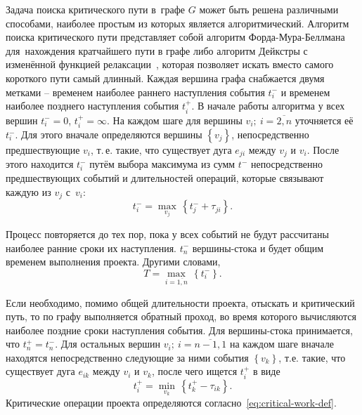 Задача поиска критического пути в~графе $G$ может быть решена различными способами, наиболее простым из которых является алгоритмический. Алгоритм поиска критического пути представляет собой алгоритм Форда-Мура-Беллмана для~нахождения кратчайшего пути в графе либо алгоритм Дейкстры с изменённой функцией релаксации~\cite{Kormen, Indians_CPM}, которая позволяет искать вместо самого короткого пути самый длинный. Каждая вершина графа снабжается двумя метками – временем наиболее раннего наступления события $t_{i}^{-}$ и временем наиболее позднего наступления события $t_{i}^{+}$. В начале работы алгоритма у всех вершин $t_{i}^{-}=0$, $t_{i}^{+}=\infty $. На каждом шаге для вершины $v_i;\ i=\overline{2,n}$ уточняется её $t_{i}^{-}$. Для этого вначале определяются вершины $\left\{ v_j \right\}$, непосредственно предшествующие $v_i$, т.\,е. такие, что существует дуга $e_{ji}$ между $v_j$ и $v_i$. После этого находится $t_{i}^{-}$ путём выбора максимума из сумм $t^{-}$ непосредственно предшествующих событий и длительностей операций, которые связывают каждую из $v_j$ с~$v_i$:
\begin{equation}
\label{eq:earliest-event-time}
  t_{i}^{-}=\underset{v_j}{\mathop{\max }}\,\left\{ t_{j}^{-}+\tau_{ji} \right\}.
\end{equation}

Процесс повторяется до тех пор, пока у всех событий не будут рассчитаны наиболее ранние сроки их наступления. $t_{n}^{-}$ вершины-стока и будет общим временем выполнения проекта. Другими словами,
\begin{equation}
\label{eq:total-project-time}
  T=\underset{i=\overline{1,n}}{\mathop{\max }}\,\left\{ t_{i}^{-} \right\}.
\end{equation}

Если необходимо, помимо общей длительности проекта, отыскать и критический путь, то по графу выполняется обратный проход, во время которого вычисляются наиболее поздние сроки наступления события. Для вершины-стока принимается, что $t_{n}^{+}=t_{n}^{-}$. Для остальных вершин $v_i;\ i=\overline{n-1,1}$ на каждом шаге вначале находятся непосредственно следующие за ними события $\left\{ v_k \right\}$, т.е. такие, что существует дуга $e_{ik}$ между $v_i$ и $v_k$, после чего ищется $t_{i}^{+}$ в виде
\begin{equation}
\label{eq:latest-event-time}
  t_{i}^{+}=\underset{v_k}{\mathop{\min }}\,\left\{ t_{k}^{+}-{{\tau }_{ik}} \right\}.
\end{equation}
Критические операции проекта определяются согласно~\eqref{eq:critical-work-def}.

